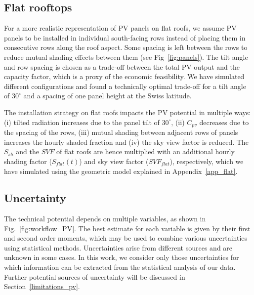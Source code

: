 
\subsection{Flat rooftops}
\label{flat}

For a more realistic representation of PV panels on flat roofs, we assume PV panels to be installed in individual south-facing rows instead of placing them in consecutive rows along the roof aspect. Some spacing is left between the rows to reduce mutual shading effects between them (see Fig~\ref{fig:panels}).
The tilt angle and row spacing is chosen as a trade-off between the total PV output and the capacity factor, which is a proxy of the economic feasibility.
We have simulated different configurations and found a technically optimal trade-off for a tilt angle of $30^\circ$ and a spacing of one panel height at the Swiss latitude.

The installation strategy on flat roofs impacts the PV potential in multiple ways: (i) tilted radiation increases due to the panel tilt of $30^\circ$, (ii) $C_{\mathit{pv}}$ decreases due to the spacing of the rows, (iii) mutual shading between adjacent rows of panels increases the hourly shaded fraction and (iv) the sky view factor is reduced. The $S_{sh}$ and the $\mathit{SVF}$ of flat roofs are hence multiplied with an additional hourly shading factor ($S_{\mathit{flat}}(t)$) and sky view factor ($\mathit{SVF}_{\mathit{flat}}$), respectively, which we have simulated using the geometric model explained in Appendix~\ref{app_flat}. 


\subsection{Uncertainty}
\label{unc}

The technical potential depends on multiple variables, as shown in Fig.~\ref{fig:workflow_PV}. 
The best estimate for each variable is given by their first and second order moments, which may be used to combine various uncertainties using statistical methods.
%
Uncertainties arise from different sources and are unknown in some cases. 
In this work, we consider only those uncertainties for which information can be extracted from the statistical analysis of our data. Further potential sources of uncertainty will be discussed in Section~\ref{limitations_pv}.

